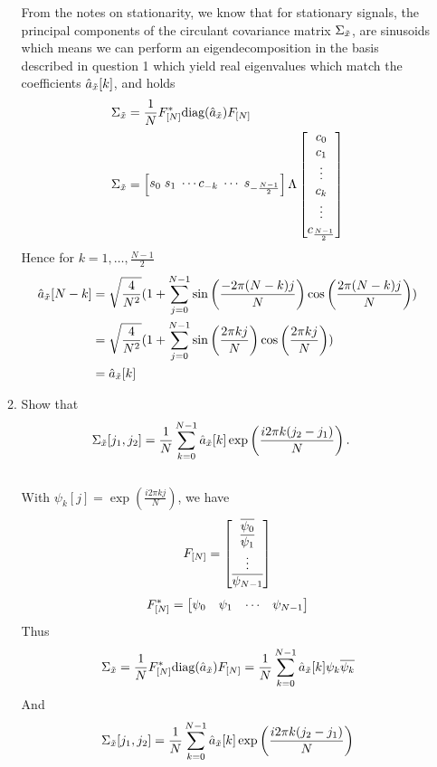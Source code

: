 \documentclass[12pt,twoside]{article}
\begin{document}
\begin{enumerate}
\begin{enumerate}
 From the notes on stationarity, we know that for stationary signals, the principal components  of the circulant covariance matrix $\Sigma_{\tilde{  x }}$, are sinusoids which means we can perform an eigendecomposition
 in the basis described in question 1 which yield real eigenvalues which match the coefficients  $\hat{a}_{\tilde{  x }}[k]$, and holds 
  \begin{align*}
 	\Sigma_{\tilde{  x }}  		&=  \frac{1}{N} F_{[N]}^* \text{diag}(\hat{a}_{\tilde{  x }}) F_{[N]}  \\
 	\Sigma_{\tilde{  x }}  	         &= \begin{bmatrix} s_0 \; s_1 \; \cdots c_{-k} \; \cdots \;  s_{-\frac{N-1}{2}}  \end{bmatrix}   \Lambda \begin{bmatrix} c_0 \\ c_1 \\ \vdots \\ c_k \\ \vdots \\ c_ {\frac{N-1}{2}}  \end{bmatrix}  \\
 \end{align*}
 Hence for $k=1,\ldots,\frac{N-1}{2}$
  \begin{align*}
 	 \hat{a}_{\tilde{  x }}[N-k]  		&= 	\sqrt{\frac{4} {N^2}} (1 + \sum_{j=0}^{N-1} \sin \left( \frac{- 2 \pi (N-k) j }{N} \right) \cos \left( \frac{2 \pi (N-k) j }{N} \right) ) \\
	 					&=	\sqrt{\frac{4} {N^2}} (1 + \sum_{j=0}^{N-1} \sin \left( \frac{2 \pi k j }{N} \right) \cos \left( \frac{2 \pi k j }{N} \right) ) \\
						&=	 \hat{a}_{\tilde{  x }}[k] 
 \end{align*}
 
 
 \item Show that
 \begin{align}
 \Sigma_{\tilde{  x }}[j_1,j_2] & = \frac{1}{N}\sum_{k=0}^{N-1} \hat{a}_{\tilde{  x }}[k] \exp\left( \frac{i2 \pi k (j_2-j_1)}{N} \right).
 \end{align}  \\
 With $\psi_{k}[j] = \exp( \frac{i 2 \pi k j}{N} )$, we have 
 $$F_{[N]} = \begin{bmatrix} \overline{\psi_0} \\ \overline{\psi_1} \\ \vdots \\ \overline{\psi_{N-1}} \end{bmatrix}$$
 $$ F_{[N]}^* = \begin{bmatrix} \psi_0 & \psi_1 & \cdots & \psi_{N-1} \end{bmatrix}$$
 Thus
 $$\Sigma_{\tilde{  x }} =  \frac{1}{N} F_{[N]}^* \text{diag}(\hat{a}_{\tilde{  x }}) F_{[N]} =  \frac{1}{N}  \sum_{k=0}^{N-1} \hat{a}_{\tilde{  x }}[k] \psi_{k}  \overline{\psi_k}$$
 And $$\Sigma_{\tilde{  x }}[j_1,j_2] = \frac{1}{N}\sum_{k=0}^{N-1} \hat{a}_{\tilde{  x }}[k] \exp\left( \frac{i2 \pi k (j_2-j_1)}{N} \right)$$
 

\end{enumerate}
\end{enumerate}
\end{document}

